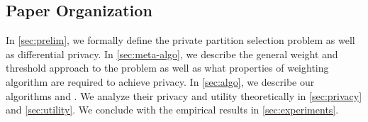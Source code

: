 \subsection{Paper Organization}

In \cref{sec:prelim}, we formally define the private partition selection problem as well as differential privacy. In \cref{sec:meta-algo}, we describe the general weight and threshold approach to the problem as well as what properties of weighting algorithm are required to achieve privacy. In \cref{sec:algo}, we describe our algorithms \ouralgo{} and \ouralgotworounds{}. We analyze their privacy and utility theoretically in \cref{sec:privacy} and \cref{sec:utility}. We conclude with the empirical results in \cref{sec:experiments}.